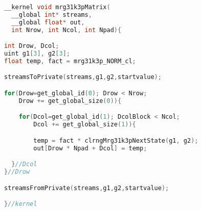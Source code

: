 \documentclass[article,nojss]{jss}\usepackage[]{graphicx}\usepackage[]{color}
\renewcommand{\subfloat}[2][need a sub-caption]{ \subcaptionbox{#1}{#2} }
\begin{document}
\begin{lstlisting}[language=C,basicstyle=\small,label={lst:uniformkernel}]
__kernel void mrg31k3pMatrix(
  __global int* streams,
  __global float* out,
  int Nrow, int Ncol, int Npad){

int Drow, Dcol;
uint g1[3], g2[3];
float temp, fact = mrg31k3p_NORM_cl;

streamsToPrivate(streams,g1,g2,startvalue);

for(Drow=get_global_id(0); Drow < Nrow;
    Drow += get_global_size(0)){

    for(Dcol=get_global_id(1); DcolBlock < Ncol; 
        Dcol += get_global_size(1)){

        temp = fact * clrngMrg31k3pNextState(g1, g2);
        out[Drow * Npad + Dcol] = temp;

  }//Dcol
}//Drow

streamsFromPrivate(streams,g1,g2,startvalue);

}//kernel
\end{lstlisting}

\end{document}

